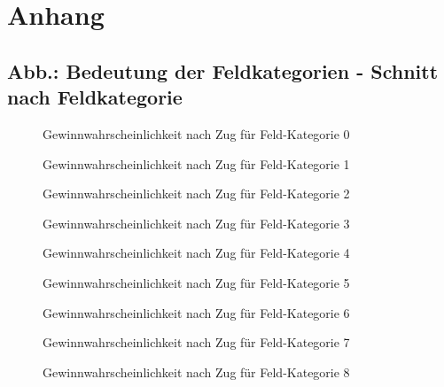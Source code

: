 \chapter{Anhang}
\section*{Abb.: Bedeutung der Feldkategorien - Schnitt nach Feldkategorie}

\label{Anhang:Abb}
\begin{figure}[ht]
\centering
{}
\caption{Gewinnwahrscheinlichkeit nach Zug für Feld-Kategorie 0}
\label{fig:win-pro-fc-0}
\end{figure}
\begin{figure}[ht]
\centering
{}
\caption{Gewinnwahrscheinlichkeit nach Zug für Feld-Kategorie 1}
\label{fig:win-pro-fc-1}
\end{figure}
\begin{figure}[ht]
\centering
{}
\caption{Gewinnwahrscheinlichkeit nach Zug für Feld-Kategorie 2}
\label{fig:win-pro-fc-2}
\end{figure}
\begin{figure}[ht]
\centering
{}
\caption{Gewinnwahrscheinlichkeit nach Zug für Feld-Kategorie 3}
\label{fig:win-pro-fc-3}
\end{figure}
\begin{figure}[ht]
\centering
{}
\caption{Gewinnwahrscheinlichkeit nach Zug für Feld-Kategorie 4}
\label{fig:win-pro-fc-4}
\end{figure}
\begin{figure}[ht]
\centering
{}
\caption{Gewinnwahrscheinlichkeit nach Zug für Feld-Kategorie 5}
\label{fig:win-pro-fc-5}
\end{figure}
\begin{figure}[ht]
\centering
{}
\caption{Gewinnwahrscheinlichkeit nach Zug für Feld-Kategorie 6}
\label{fig:win-pro-fc-6}
\end{figure}
\begin{figure}[ht]
\centering
{}
\caption{Gewinnwahrscheinlichkeit nach Zug für Feld-Kategorie 7}
\label{fig:win-pro-fc-7}
\end{figure}
\begin{figure}[ht]
\centering
{}
\caption{Gewinnwahrscheinlichkeit nach Zug für Feld-Kategorie 8}
\label{fig:win-pro-fc-8}
\end{figure}

